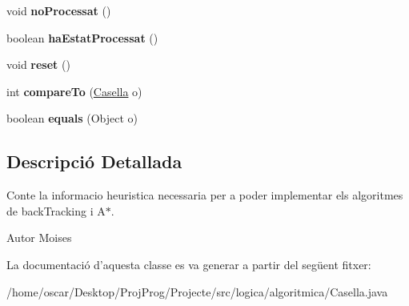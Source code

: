 \begin{DoxyCompactItemize}
\item 
\hypertarget{classlogica_1_1algoritmica_1_1_casella_a081ffe85bdbe5d97b330c40d2881a74f}{void {\bfseries no\+Processat} ()}\label{classlogica_1_1algoritmica_1_1_casella_a081ffe85bdbe5d97b330c40d2881a74f}

\item 
\hypertarget{classlogica_1_1algoritmica_1_1_casella_a79b54543059fa328c5d18a96d694cf54}{boolean {\bfseries ha\+Estat\+Processat} ()}\label{classlogica_1_1algoritmica_1_1_casella_a79b54543059fa328c5d18a96d694cf54}

\item 
\hypertarget{classlogica_1_1algoritmica_1_1_casella_a8ed287353991f4b700bc45145dc00ab7}{void {\bfseries reset} ()}\label{classlogica_1_1algoritmica_1_1_casella_a8ed287353991f4b700bc45145dc00ab7}

\item 
\hypertarget{classlogica_1_1algoritmica_1_1_casella_aae2b9f535fd0da3a750f6a6048db1944}{int {\bfseries compare\+To} (\hyperlink{classlogica_1_1algoritmica_1_1_casella}{Casella} o)}\label{classlogica_1_1algoritmica_1_1_casella_aae2b9f535fd0da3a750f6a6048db1944}

\item 
\hypertarget{classlogica_1_1algoritmica_1_1_casella_ab47747886e465a9fdda726b0cdb987da}{boolean {\bfseries equals} (Object o)}\label{classlogica_1_1algoritmica_1_1_casella_ab47747886e465a9fdda726b0cdb987da}

\end{DoxyCompactItemize}


\subsection{Descripció Detallada}
Conte la informacio heuristica necessaria per a poder implementar els algoritmes de back\+Tracking i A$\ast$. 

\begin{DoxyAuthor}{Autor}
Moises 
\end{DoxyAuthor}


La documentació d'aquesta classe es va generar a partir del següent fitxer\+:\begin{DoxyCompactItemize}
\item 
/home/oscar/\+Desktop/\+Proj\+Prog/\+Projecte/src/logica/algoritmica/Casella.\+java\end{DoxyCompactItemize}
